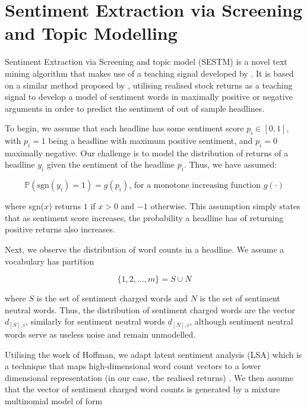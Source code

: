 \section{Sentiment Extraction via Screening and Topic Modelling}
Sentiment Extraction via Screening and topic model (SESTM) is a novel text mining algorithm that makes use of a teaching signal developed by \textcite{sestm}. It is based on a similar method proposed by \textcite{jegadeesh2013word}, utilising realised stock returns as a teaching signal to develop a model of sentiment words in maximally positive or negative arguments in order to predict the sentiment of out of sample headlines.

To begin, we assume that each headline has some sentiment score $p_i \in [0,1]$, with $p_i = 1$ being a headline with maximum positive sentiment, and $p_i = 0$ maximally negative. Our challenge is to model the distribution of returns of a headline $y_i$ given the sentiment of the headline $p_i$. Thus, we have assumed:

\begin{equation}
\mathbb{P}(\text{sgn}(y_i) = 1) = g(p_i) \text{, for a monotone increasing function } g(\cdot)
\end{equation}

\noindent
where sgn($x$) returns $1$ if $x > 0$ and $-1$ otherwise. This assumption simply states that as sentiment score increases, the probability a headline has of returning positive returns also increases.

Next, we observe the distribution of word counts in a headline. We assume a vocabulary has partition

\begin{equation}
\{1,2,\dots,m\} = S \cup N
\end{equation}

\noindent
where $S$ is the set of sentiment charged words and $N$ is the set of sentiment neutral words. Thus, the distribution of sentiment charged words are the vector $d_{[S],i}$, similarly for sentiment neutral words $d_{[N],i}$, although sentiment neutral words serve as useless noise and remain unmodelled.

Utilising the work of Hoffman, we adapt latent sentiment analysis (LSA) which is a technique that maps high-dimensional word count vectors to a lower dimensional representation (in our case, the realised returns) \parencite{lsa}. We then assume that the vector of sentiment charged word counts is generated by a mixture multinomial model of form

